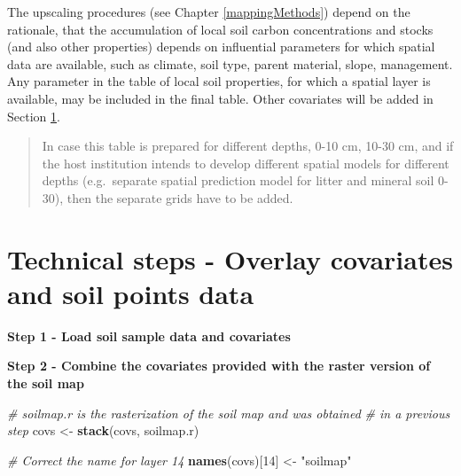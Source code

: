 \documentclass[10pt,b5paper,]{book}
\newenvironment{Shaded}{\begin{snugshade}}{\end{snugshade}}
\newcommand{\CommentTok}[1]{\textcolor[rgb]{0.56,0.35,0.01}{\textit{#1}}}
\newcommand{\DataTypeTok}[1]{\textcolor[rgb]{0.13,0.29,0.53}{#1}}
\newcommand{\DecValTok}[1]{\textcolor[rgb]{0.00,0.00,0.81}{#1}}
\newcommand{\KeywordTok}[1]{\textcolor[rgb]{0.13,0.29,0.53}{\textbf{#1}}}
\newcommand{\NormalTok}[1]{#1}
\newcommand{\OtherTok}[1]{\textcolor[rgb]{0.56,0.35,0.01}{#1}}
\newcommand{\StringTok}[1]{\textcolor[rgb]{0.31,0.60,0.02}{#1}}
\theoremstyle{definition}
\theoremstyle{definition}
\theoremstyle{definition}
\theoremstyle{remark}
\begin{document}
The upscaling procedures (see Chapter \ref{mappingMethods}) depend on
the rationale, that the accumulation of local soil carbon concentrations
and stocks (and also other properties) depends on influential parameters
for which spatial data are available, such as climate, soil type, parent
material, slope, management. Any parameter in the table of local soil
properties, for which a spatial layer is available, may be included in
the final table. Other covariates will be added in Section
\ref{overlay-soil-covariates}.

\begin{quote}
In case this table is prepared for different depths, 0-10 cm, 10-30 cm,
and if the host institution intends to develop different spatial models
for different depths (e.g.~separate spatial prediction model for litter
and mineral soil 0-30), then the separate grids have to be added.
\end{quote}

\hypertarget{overlay-soil-covariates}{%
\section{Technical steps - Overlay covariates and soil points
data}\label{overlay-soil-covariates}}

\textbf{Step 1 - Load soil sample data and covariates}

\begin{Shaded}
\end{Shaded}

\textbf{Step 2 - Combine the covariates provided with the raster version
of the soil map}

\begin{Shaded}
\begin{Highlighting}[]
\CommentTok{# soilmap.r is the rasterization of the soil map and was obtained}
\CommentTok{# in a previous step}
\NormalTok{covs <-}\StringTok{ }\KeywordTok{stack}\NormalTok{(covs, soilmap.r)}

\CommentTok{# Correct the name for layer 14}
\KeywordTok{names}\NormalTok{(covs)[}\DecValTok{14}\NormalTok{] <-}\StringTok{ "soilmap"}
\end{Highlighting}
\end{Shaded}
\end{document}
